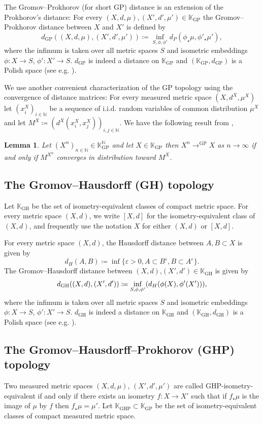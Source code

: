 \documentclass[11pt]{article}
\theoremstyle{plain}
\newtheorem{lemma}[theorem]{Lemma}
\theoremstyle{definition}
\theoremstyle{remark}
\newcommand{\N}{\mathbb{N}} %
\newcommand{\1}{\mathbbm{1}} %
\newcommand{\e}{\varepsilon} %
\DeclareMathOperator*{\limit}{\longrightarrow}
\newcommand{\K}{\mathbb{K}}
\newcommand{\GH}{\text{GH}}
\newcommand{\GP}{\text{GP}}
\newcommand{\GHP}{\text{GHP}}
\let\originalleft\left
\let\originalright\right
\renewcommand{\left}{\mathopen{}\mathclose\bgroup\originalleft}
\renewcommand{\right}{\aftergroup\egroup\originalright}
\begin{document}
The  Gromov--Prokhorov (for short GP) distance is an extension of the Prokhorov's distance: For every $(X,d,\mu),(X',d',\mu')\in \K_{\GP}$ the Gromov--Prokhorov distance between $X$ and $X'$ is defined by
\[ d_{\GP}((X,d,\mu),(X',d',\mu'))\coloneqq\inf_{S,\phi,\phi'} d_P(\phi_\star \mu, \phi'_\star\mu'),\]
where the infimum is taken over all metric spaces $S$ and isometric embeddings $\phi :X\to S$, $\phi' :X'\to S$. $d_{\GP}$ is indeed a distance on $\K_{\GP}$ and $(\K_{\GP},d_{\GP})$ is a Polish space (see e.g. \cite{ADH13}).

We use another convenient characterization of the GP topology using the convergence of distance matrices: For every measured metric space  $(X,d^X,\mu^X)$ let $(x_i^X)_{i\in \N}$ be a sequence of i.i.d. random variables of common distribution $\mu^X$ and let $M^X\coloneqq(d^X(x_i^X,x_j^X))_{i,j\in \N}$. We have the following result from \cite{Loh13},

\begin{lemma} \label{equivGP} Let $(X^n)_{n\in \N} \in \K_{\GP}^\N$ and let $X\in \K_{\GP}$ then $X^n\limit^{\GP}X$ as $n\to \infty$ if and only if $M^{X^n}$ converges in distribution toward $M^X$.
\end{lemma}
\subsection{The Gromov--Hausdorff (GH) topology} \label{GH}
Let $\K_{\GH}$ be the set of isometry-equivalent classes of compact metric space. For every metric space $(X,d)$, we write $[X,d]$ for the isometry-equivalent class of $(X,d)$, and frequently use the notation $X$ for either $(X,d)$ or $[X,d]$. 

 For every metric space $(X,d)$, the Hausdorff distance between $A,B\subset X$ is given by
\[d_H(A,B)\coloneqq \inf\{\e>0, A\subset B^\e, B\subset A^\e \}. \]
The Gromov--Hausdorff distance between $(X,d)$,$(X',d')\in \K_{\GH}$ is given by 
\[ d_{\GH}((X,d),(X',d'))\coloneqq\inf_{S,\phi,\phi'} \left (d_H(\phi(X), \phi'(X')) \right ),\]
where the infimum is taken over all metric spaces $S$ and isometric embeddings $\phi :X\to S$, $\phi' :X'\to S$. $d_{\GH}$ is indeed a distance on $\K_{\GH}$ and $(\K_{\GH},d_{\GH})$ is a Polish space (see e.g.  \cite{ADH13}).


\subsection{The Gromov--Hausdorff--Prokhorov (GHP) topology}
Two measured metric spaces $(X,d,\mu)$, $(X',d',\mu')$ are called GHP-isometry-equivalent if and only if there exists an isometry $f:X\to X'$ such that if $f_\star \mu$ is the image of $\mu$ by $f$ then $f_\star \mu=\mu'$.
Let $\K_{\GHP}\subset\K_{\GP}$ be the set of isometry-equivalent classes of compact measured metric space.
\end{document}
